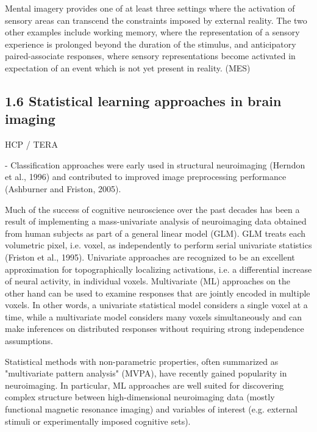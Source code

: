 \documentclass[authoryear,review,3p]{elsarticle}
\begin{document}
Mental imagery provides one of at least three settings where the activation of sensory areas can transcend the constraints imposed by external reality. The two other examples include working memory, where the representation of a sensory experience is prolonged beyond the duration of the stimulus, and anticipatory paired-associate responses, where sensory representations become activated in expectation of an event which is not yet present in reality. (MES)




\subsection*{1.6 Statistical learning approaches in brain imaging}

HCP / TERA

- Classification approaches were early used in structural neuroimaging (Herndon et al., 1996) and contributed to improved image preprocessing performance (Ashburner and Friston, 2005).



Much of the success of cognitive neuroscience over the past decades has been a result of implementing a mass-univariate analysis of neuroimaging data obtained from human subjects as part of a general linear model (GLM). GLM treats each volumetric pixel, i.e. voxel, as independently to perform serial univariate statistics (Friston et al., 1995). 
Univariate approaches are recognized to be an excellent approximation for topographically localizing activations, i.e. a differential increase of neural activity, in individual voxels. Multivariate (ML) approaches on the other hand can be used to examine responses that are jointly encoded in multiple voxels. In other words, a univariate statistical model considers a single voxel at a time, while a multivariate model considers many voxels simultaneously and can make inferences on distributed responses without requiring strong independence assumptions. 

Statistical methods with non-parametric properties, often summarized as "multivariate pattern analysis" (MVPA), have recently gained popularity in neuroimaging. In particular, ML approaches are well suited for discovering complex structure between high-dimensional neuroimaging data (mostly functional magnetic resonance imaging) and variables of interest (e.g. external stimuli or experimentally imposed cognitive sets). 
\end{document}
